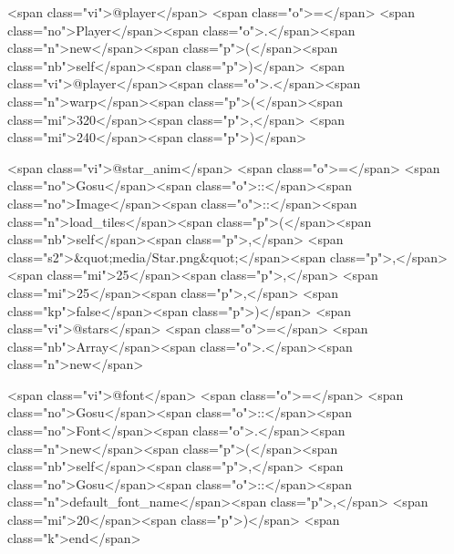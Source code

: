 \begin{rawhtml}
    <span class="vi">@player</span> <span class="o">=</span> <span class="no">Player</span><span class="o">.</span><span class="n">new</span><span class="p">(</span><span class="nb">self</span><span class="p">)</span>
    <span class="vi">@player</span><span class="o">.</span><span class="n">warp</span><span class="p">(</span><span class="mi">320</span><span class="p">,</span> <span class="mi">240</span><span class="p">)</span>

    <span class="vi">@star_anim</span> <span class="o">=</span> <span class="no">Gosu</span><span class="o">::</span><span class="no">Image</span><span class="o">::</span><span class="n">load_tiles</span><span class="p">(</span><span class="nb">self</span><span class="p">,</span> <span class="s2">&quot;media/Star.png&quot;</span><span class="p">,</span> <span class="mi">25</span><span class="p">,</span> <span class="mi">25</span><span class="p">,</span> <span class="kp">false</span><span class="p">)</span>
    <span class="vi">@stars</span> <span class="o">=</span> <span class="nb">Array</span><span class="o">.</span><span class="n">new</span>
    
    <span class="vi">@font</span> <span class="o">=</span> <span class="no">Gosu</span><span class="o">::</span><span class="no">Font</span><span class="o">.</span><span class="n">new</span><span class="p">(</span><span class="nb">self</span><span class="p">,</span> <span class="no">Gosu</span><span class="o">::</span><span class="n">default_font_name</span><span class="p">,</span> <span class="mi">20</span><span class="p">)</span>
  <span class="k">end</span>


\end{rawhtml}

